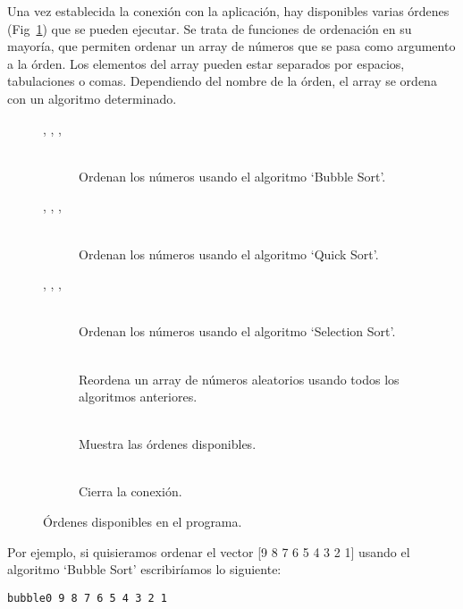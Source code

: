 Una vez establecida la conexión con la aplicación, hay disponibles varias órdenes (Fig~\ref{sorted_ordenes}) que se pueden ejecutar. Se trata de funciones de ordenación en su mayoría, que permiten ordenar un array de números que se pasa como argumento a la órden. Los elementos del array pueden estar separados por espacios, tabulaciones o comas. Dependiendo del nombre de la órden, el array se ordena con un algoritmo determinado.

\begin{figure}[htb]
\begin{description}
	\item[, , , ] \hfill \\
	 Ordenan los números usando el algoritmo `Bubble Sort'.
	\item[, , , ] \hfill \\
	 Ordenan los números usando el algoritmo `Quick Sort'.
	\item[, , , ] \hfill \\
	 Ordenan los números usando el algoritmo `Selection Sort'.
	\item[] \hfill \\
	 Reordena un array de números aleatorios usando todos los algoritmos anteriores.
	\item[] \hfill \\
	 Muestra las órdenes disponibles.
	\item[] \hfill \\
	 Cierra la conexión.
\end{description}
\caption{Órdenes disponibles en el programa.}
\label{sorted_ordenes}
\end{figure}

Por ejemplo, si quisieramos ordenar el vector [9 8 7 6 5 4 3 2 1] usando el algoritmo `Bubble Sort' escribiríamos lo siguiente:
\begin{lstlisting}
bubble0 9 8 7 6 5 4 3 2 1
\end{lstlisting}

